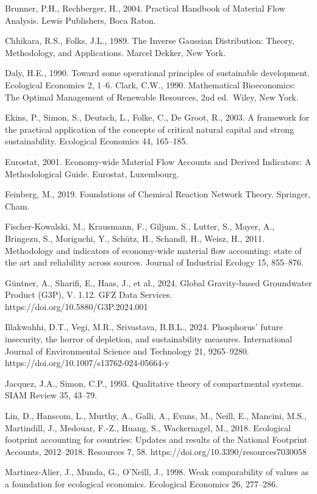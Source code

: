 \documentclass[11pt]{article}
\begin{document}
Brunner, P.H., Rechberger, H., 2004. Practical Handbook of Material Flow
Analysis. Lewis Publishers, Boca Raton.

Chhikara, R.S., Folks, J.L., 1989. The Inverse Gaussian Distribution:
Theory, Methodology, and Applications. Marcel Dekker, New York.

Daly, H.E., 1990. Toward some operational principles of sustainable
development. Ecological Economics 2, 1--6. Clark, C.W., 1990.
Mathematical Bioeconomics: The Optimal Management of Renewable
Resources, 2nd ed.~Wiley, New York.

Ekins, P., Simon, S., Deutsch, L., Folke, C., De Groot, R., 2003. A
framework for the practical application of the concepts of critical
natural capital and strong sustainability. Ecological Economics 44,
165--185.

Eurostat, 2001. Economy-wide Material Flow Accounts and Derived
Indicators: A Methodological Guide. Eurostat, Luxembourg.

Feinberg, M., 2019. Foundations of Chemical Reaction Network Theory.
Springer, Cham.

Fischer-Kowalski, M., Krausmann, F., Giljum, S., Lutter, S., Mayer, A.,
Bringezu, S., Moriguchi, Y., Sch\"utz, H., Schandl, H., Weisz, H., 2011.
Methodology and indicators of economy-wide material flow accounting:
state of the art and reliability across sources. Journal of Industrial
Ecology 15, 855--876.

G\"untner, A., Sharifi, E., Haas, J., et al., 2024. Global Gravity-based
Groundwater Product (G3P), V. 1.12. GFZ Data Services.
https://doi.org/10.5880/G3P.2024.001

Illakwahhi, D.T., Vegi, M.R., Srivastava, B.B.L., 2024. Phosphorus'
future insecurity, the horror of depletion, and sustainability measures.
International Journal of Environmental Science and Technology 21,
9265--9280. https://doi.org/10.1007/s13762-024-05664-y

Jacquez, J.A., Simon, C.P., 1993. Qualitative theory of compartmental
systems. SIAM Review 35, 43--79.

Lin, D., Hanscom, L., Murthy, A., Galli, A., Evans, M., Neill, E.,
Mancini, M.S., Martindill, J., Medouar, F.-Z., Huang, S., Wackernagel,
M., 2018. Ecological footprint accounting for countries: Updates and
results of the National Footprint Accounts, 2012--2018. Resources 7, 58.
https://doi.org/10.3390/resources7030058

Martinez-Alier, J., Munda, G., O'Neill, J., 1998. Weak comparability of
values as a foundation for ecological economics. Ecological Economics
26, 277--286.
\end{document}
